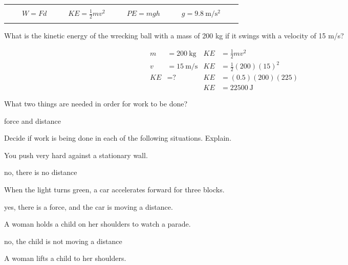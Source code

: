 \documentclass[10pt]{exam}
\newcommand{\printeqs}{
  \ifprintanswers
  \else
    \begin{center}
      \begin{tabular}{|*9c*5c|}
        \hline 
        &&&&&&&&&&&&&\\
        && 
        $W=Fd$                 & & & 
        $KE = \frac{1}{2}mv^2$ & & & 
        $PE=mgh$               & & & 
        $g=\SI{9.8}{\meter\per\second^2}$
        &&\\
        &&&&&&&&&&&&&\\
        \hline 
      \end{tabular}
    \end{center}
  \fi
}
\newenvironment{EnvKU}{
  \ifprintanswers
  \else
    \ku
  \fi
  \begin{solution}
}{
  \end{solution}
}
\begin{document}
\begin{questions}
\pagebreak

\printeqs

\question
  What is the kinetic energy of the wrecking ball with a mass of 200 kg if it swings with a velocity of 15 m/s?

  \begin{EnvKU}
    \begin{align*}
      m  &= \SI{200}{\kilo\gram}
                          & KE &= \frac{1}{2}mv^2 \\
      v  &= \SI{15}{\meter\per\second}    
                          & KE &= \frac{1}{2}(200)(15)^2 \\
      KE &= \text{?}
                          & KE &= (0.5)(200)(225) \\
         &                & KE &= \SI{22500}{\joule}
    \end{align*}
  \end{EnvKU}

\question
  What two things are needed in order for work to be done?

  \begin{solution}[\stretch{1}]
    force and distance
  \end{solution}

\question
  Decide if work is being done in each of the following situations.  Explain.

  \begin{parts}
    \item 
      You push very hard against a stationary wall.
    
      \begin{solution}[3em]
        no, there is no distance
      \end{solution}

    \item 
      When the light turns green, a car accelerates forward for three blocks.
    
      \begin{solution}[3em]
        yes, there is a force, and the car is moving a distance.
      \end{solution}

    \item 
      A woman holds a child on her shoulders to watch a parade.
    
      \begin{solution}[3em]
        no, the child is not moving a distance
      \end{solution}

    \item
      A woman lifts a child to her shoulders.
    

\end{parts}
\end{questions}
\end{document}
